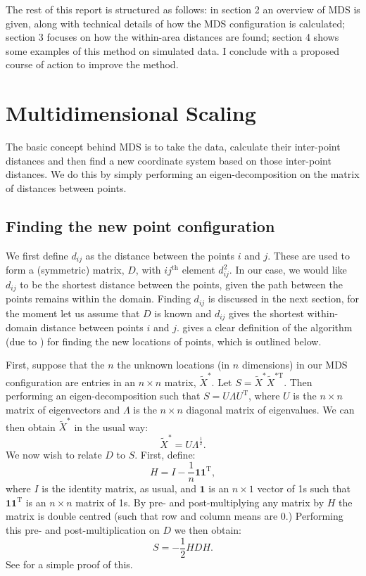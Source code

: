 \documentclass[a4paper,10pt]{article}
\newcommand{\tr}[1]{#1^{\text{T}}}
\newcommand{\cross}{\times}
\begin{document}
The rest of this report is structured as follows: in section 2 an overview of MDS is given, along with technical details of how the MDS configuration is calculated; section 3 focuses on how the within-area distances are found; section 4 shows some examples of this method on simulated data. I conclude with a proposed course of action to improve the method.

\section{Multidimensional Scaling}

The basic concept behind MDS is to take the data, calculate their inter-point distances and then find a new coordinate system based on those inter-point distances. We do this by simply performing an eigen-decomposition on the matrix of distances between points.

\subsection{Finding the new point configuration}

We first define $d_{ij}$ as the distance between the points $i$ and $j$. These are used to form a (symmetric) matrix, $D$, with $ij^{\text{th}}$ element $d^2_{ij}$. In our case, we would like $d_{ij}$ to be the shortest distance between the points, given the path between the points remains within the domain. Finding $d_{ij}$ is discussed in the next section, for the moment let us assume that $D$ is known and $d_{ij}$ gives the shortest within-domain distance between points $i$ and $j$. \cite{diaconis08} gives a clear definition of the algorithm (due to \cite{schoenberg35}) for finding the new locations of points, which is outlined below.

First, suppose that the $n$ the unknown locations (in $n$ dimensions) in our MDS configuration are entries in an $n \times n$ matrix, $\tilde{X}^*$. Let $S=\tilde{X}^{*} \tilde{X}^{*\text{T}} $. Then performing an eigen-decomposition such that $S=U\Lambda\tr{U}$, where $U$ is the $n \cross n$ matrix of eigenvectors and $\Lambda$ is the $n \cross n$ diagonal matrix of eigenvalues. We can then obtain $\tilde{X}^*$ in the usual way:
\begin{equation}
\tilde{X}^*=U\Lambda^{\frac{1}{2}}.
\end{equation}
We now wish to relate $D$ to $S$. First, define:
\begin{equation}
H = I-\frac{1}{n}\mathbf{1}\tr{\mathbf{1}},
\end{equation}
where $I$ is the identity matrix, as usual, and $\mathbf{1}$ is an $n \cross 1$ vector of 1s such that $\mathbf{1}\tr{\mathbf{1}}$ is an $n \cross n$ matrix of 1s. By pre- and post-multiplying any matrix by $H$ the matrix is double centred (such that row and column means are 0.) Performing this pre- and post-multiplication on $D$ we then obtain:
\begin{equation}
S = -\frac{1}{2}HDH.
\end{equation}
See \cite{diaconis08} for a simple proof of this.
\end{document}
